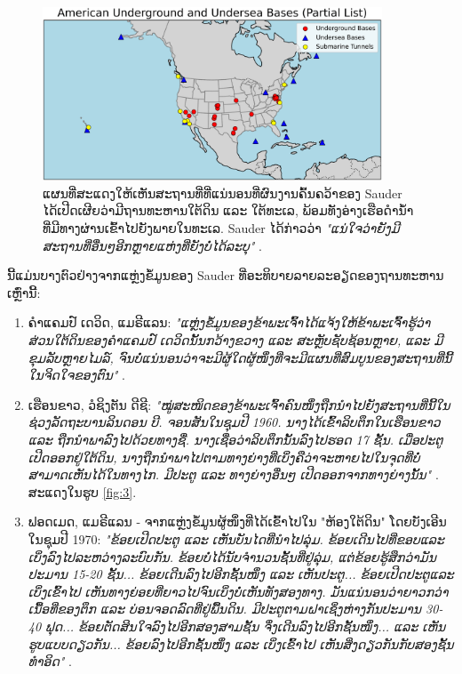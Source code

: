 \documentclass[10pt,twocolumn,letterpaper]{article}
\begin{document}
\begin{figure}[t]
\begin{center}
\includegraphics[width=0.9\textwidth]{basescrop.png}
\end{center}
\caption{ແຜນທີ່ສະແດງໃຫ້ເຫັນສະຖານທີ່ທີ່ແນ່ນອນທີ່ຜົນງານຄົ້ນຄວ້າຂອງ Sauder ໄດ້ເປີດເຜີຍວ່າມີຖານທະຫານໃຕ້ດິນ ແລະ ໃຕ້ທະເລ, ພ້ອມທັງອ່າງເຮືອດຳນ້ຳທີ່ມີທາງຜ່ານເຂົ້າໄປຍັງພາຍໃນທະເລ. Sauder ໄດ້ກ່າວວ່າ \textit{"ແນ່ໃຈວ່າຍັງມີສະຖານທີ່ອື່ນໆອີກຫຼາຍແຫ່ງທີ່ຍັງບໍ່ໄດ້ລະບຸ"} \cite{22}.}
\label{fig:4}
\end{figure}

ນີ້ແມ່ນບາງຕົວຢ່າງຈາກແຫຼ່ງຂໍ້ມູນຂອງ Sauder ທີ່ອະທິບາຍລາຍລະອຽດຂອງຖານທະຫານເຫຼົ່ານີ້:
\begin{flushleft}
\begin{enumerate}
    \item ຄໍາແຄມປ໌ ເດວິດ, ແມຣີແລນ: \textit{"ແຫຼ່ງຂໍ້ມູນຂອງຂ້າພະເຈົ້າໄດ້ແຈ້ງໃຫ້ຂ້າພະເຈົ້າຮູ້ວ່າສ່ວນໃຕ້ດິນຂອງຄໍາແຄມປ໌ ເດວິດນັ້ນກວ້າງຂວາງ ແລະ ສະຫຼັບຊັບຊ້ອນຫຼາຍ, ແລະ ມີຂຸມລັບຫຼາຍໄມລ໌, ຈົນບໍ່ແນ່ນອນວ່າຈະມີຜູ້ໃດຜູ້ໜຶ່ງທີ່ຈະມີແຜນທີ່ສົມບູນຂອງສະຖານທີ່ນີ້ໃນຈິດໃຈຂອງຕົນ"} \cite{22}.
    \item ເຮືອນຂາວ, ວໍຊິງຕັນ ດີຊີ: \textit{"ໝູ່ສະໜິດຂອງຂ້າພະເຈົ້າຄົນໜຶ່ງຖືກນຳໄປຍັງສະຖານທີ່ນີ້ໃນຊ່ວງລັດຖະບານລິນດອນ ບີ. ຈອນສັນໃນຊຸມປີ 1960. ນາງໄດ້ເຂົ້າລິບຕຶກໃນເຮືອນຂາວ ແລະ ຖືກນຳພາລົງໄປດ້ວຍທາງຊື່. ນາງເຊື່ອວ່າລິບຕຶກນັ້ນລົງໄປຮອດ 17 ຊັ້ນ. ເມື່ອປະຕູເປີດອອກຢູ່ໃຕ້ດິນ, ນາງຖືກນຳພາໄປຕາມທາງຍ່າງທີ່ເບິ່ງຄືວ່າຈະຫາຍໄປໃນຈຸດທີ່ບໍ່ສາມາດເຫັນໄດ້ໃນທາງໄກ. ມີປະຕູ ແລະ ທາງຍ່າງອື່ນໆ ເປີດອອກຈາກທາງຍ່າງນັ້ນ"} \cite{22}. ສະແດງໃນຮູບ \ref{fig:3}.
    \item ຟອດເມດ, ແມຣີແລນ - ຈາກແຫຼ່ງຂໍ້ມູນຜູ້ໜຶ່ງທີ່ໄດ້ເຂົ້າໄປໃນ "ຫ້ອງໃຕ້ດິນ" ໂດຍບັງເອີນໃນຊຸມປີ 1970: \textit{"ຂ້ອຍເປີດປະຕູ ແລະ ເຫັນບັນໄດທີ່ນຳໄປລຸ່ມ. ຂ້ອຍເດີນໄປທີ່ຂອບແລະເບິ່ງລົງໄປລະຫວ່າງລະບົບກັນ. ຂ້ອຍບໍ່ໄດ້ນັບຈຳນວນຊັ້ນທີ່ຢູ່ລຸ່ມ, ແຕ່ຂ້ອຍຮູ້ສຶກວ່າມັນປະມານ 15-20 ຊັ້ນ... ຂ້ອຍເດີນລົງໄປອີກຊັ້ນໜຶ່ງ ແລະ ເຫັນປະຕູ... ຂ້ອຍເປີດປະຕູແລະເບິ່ງເຂົ້າໄປ ເຫັນທາງຍ່ອຍທີ່ຍາວໄປຈົນເບິ່ງບໍ່ເຫັນທັງສອງທາງ. ມັນແນ່ນອນວ່າຍາວກວ່າເນື້ອທີ່ຂອງຕຶກ ແລະ ບ່ອນຈອດລົດທີ່ຢູ່ພື້ນດິນ. ມີປະຕູຕາມຝາເຊິ່ງຫ່າງກັນປະມານ 30-40 ຟຸດ... ຂ້ອຍຕັດສິນໃຈລົງໄປອີກສອງສາມຊັ້ນ ຈຶ່ງເດີນລົງໄປອີກຊັ້ນໜຶ່ງ... ແລະ ເຫັນຮູບແບບດຽວກັນ... ຂ້ອຍລົງໄປອີກຊັ້ນໜຶ່ງ ແລະ ເບິ່ງເຂົ້າໄປ ເຫັນສິ່ງດຽວກັນກັບສອງຊັ້ນທຳອິດ"} \cite{22}.
\end{enumerate}
\end{flushleft}
\end{document}
